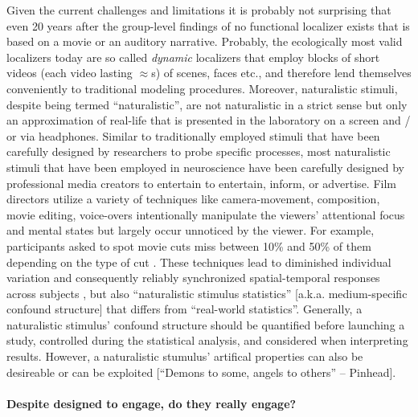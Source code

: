 %
Given the current challenges and limitations it is probably not surprising that
even 20 years after the group-level findings of \citet{bartels2004mapping} no
functional localizer exists that is based on a movie or an auditory narrative.
%
Probably, the ecologically most valid localizers today are so called
\textit{dynamic} localizers \citep[e.g.,][]{pitcher2011differential,
fox2009defining} that employ blocks of short videos (each video lasting
$\approx$\unit[2-3]{s}) of scenes, faces etc., and therefore lend themselves
conveniently to traditional modeling procedures.
%
Moreover, naturalistic stimuli, despite being termed ``naturalistic'', are not
naturalistic in a strict sense but only an approximation of real-life that is
presented in the laboratory on a screen and / or via headphones.
%
Similar to traditionally employed stimuli that have been carefully designed by
researchers to probe specific processes, most naturalistic stimuli that have
been employed in neuroscience have been carefully designed by professional media
creators to entertain to entertain, inform, or advertise.
%
Film directors utilize a variety of techniques like camera-movement,
composition, movie editing, voice-overs \citep{brown2012cinematography,
dancyger2011film-technique, katz1991film, mercado2011filmmakers} intentionally
manipulate the viewers' attentional focus and mental states but largely occur
unnoticed by the viewer.
%
For example, participants asked to spot movie cuts miss between 10\% and 50\% of
them depending on the type of cut \citep{smith2008edit}.
%
These techniques lead to diminished individual variation and consequently
reliably synchronized spatial-temporal responses across subjects
\citep{hasson2008neurocinematics}, but also ``naturalistic stimulus statistics''
[a.k.a. medium-specific confound structure] that differs from ``real-world
statistics''.
%
Generally, a naturalistic stimulus' confound structure should be quantified
before launching a study, controlled during the statistical analysis, and
considered when interpreting results.
%
However, a naturalistic stumulus' artifical properties can also be desireable
\citep{kauttonen2018brain} or can be exploited \citep{haeusler2022processing}
[``Demons to some, angels to others'' -- Pinhead].


\paragraph{Despite designed to engage, do they really engage?}


